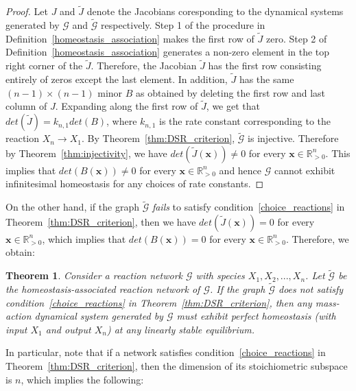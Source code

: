 \documentclass[11pt]{article}
\theoremstyle{plain}
\newtheorem{theorem}{Theorem}[section]
\theoremstyle{definition}
\theoremstyle{remark}
\newcommand\x{\boldsymbol{x}}
\newcommand\GG{\mathcal{G}}
\begin{document}
\begin{proof}
Let $J$ and $\tilde{J}$ denote the Jacobians coresponding to the dynamical systems generated by $\GG$ and $\tilde{\GG}$ respectively. Step 1 of the procedure in Definition~\ref{homeostasis_association} makes the first row of $\tilde{J}$ zero. Step 2 of Definition~\ref{homeostasis_association} generates a non-zero element in the top right corner of the $\tilde{J}$. Therefore, the Jacobian $\tilde{J}$ has the first row consisting entirely of zeros except the last element. In addition, $\tilde{J}$ has the same $(n-1)\times (n-1)$ minor $B$ as obtained by deleting the first row and last column of $J$. Expanding along the first row of $\tilde{J}$, we get that $det(\tilde{J})=k_{n,1}det(B)$, where $k_{n,1}$ is the rate constant corresponding to the reaction $X_n\rightarrow X_1$. By Theorem~\ref{thm:DSR_criterion}, $\tilde{\GG}$ is injective. Therefore by Theorem~\ref{thm:injectivity}, we have $det(\tilde{J}(\x))\neq 0$ for every $\x\in\mathbb{R}^n_{>0}$. This implies that $det(B(\x))\neq 0$ for every $\x\in\mathbb{R}^n_{>0}$ and hence $\GG$ cannot exhibit infinitesimal homeostasis for any choices of rate constants. 
\end{proof}

\bigskip

On the other hand, if the  graph  $\tilde{\GG}$ {\em fails} to satisfy condition~\ref{choice_reactions} in Theorem~\ref{thm:DSR_criterion}, then  we have $det(\tilde{J}(\x)) = 0$ for every $\x\in\mathbb{R}^n_{>0}$, which implies that $det(B(\x))=0$ for every $\x\in\mathbb{R}^n_{>0}$. Therefore, we obtain:


\bigskip


\begin{theorem}\label{thm:reaction_network_perfect_homeostasis}
Consider a reaction network $\GG$ with species $X_1,X_2,...,X_n$. Let $\tilde{\GG}$ be the homeostasis-associated reaction network of $\GG$. If the  graph  $\tilde{\GG}$ does not satisfy  condition~\ref{choice_reactions} in Theorem~\ref{thm:DSR_criterion}, then any mass-action dynamical system generated by $\GG$ must exhibit perfect homeostasis (with input $X_1$ and output $X_n$) at any linearly stable equilibrium.
\end{theorem}



\bigskip

In particular, note that if a network satisfies  condition~\ref{choice_reactions} in Theorem~\ref{thm:DSR_criterion}, then  the dimension of its stoichiometric subspace is $n$, which implies the following:
\end{document}
